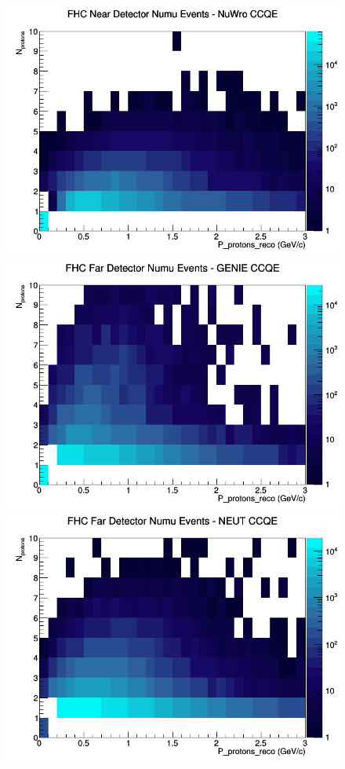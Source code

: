 \begin{figure}[h]
\includegraphics[width=\linewidth]{eff_N_P/FGT/protons/CCQE_FHC_ND_numu_N_P_NuWro.png}
\endminipage
\newline
{}
\includegraphics[width=\linewidth]{eff_N_P/FGT/protons/CCQE_FHC_FD_numu_N_P_GENIE.png}
\endminipage
{}
\includegraphics[width=\linewidth]{eff_N_P/FGT/protons/CCQE_FHC_FD_numu_N_P_NEUT.png}

\end{figure}
